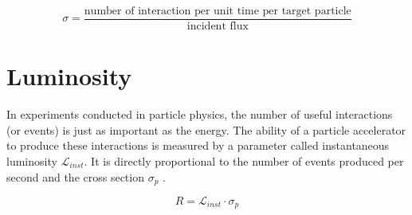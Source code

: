 \begin{equation}
\sigma=\frac{\text{number of interaction per unit time per target particle}}{\text{incident flux}}
\label{cross}
\end{equation}





\section{Luminosity }

In experiments conducted in particle physics, the number of useful interactions (or events) is just as important as the energy. The ability of a particle accelerator to produce these interactions is measured by a parameter called instantaneous luminosity $\mathcal{L}_{inst}$. It is directly proportional to the number of events produced per second and the cross section $\sigma_{p}$ \cite{concept_of_luminosity}.

\begin{equation}
R=\mathcal{L}_{inst} \cdot \sigma_{p}
\end{equation}

